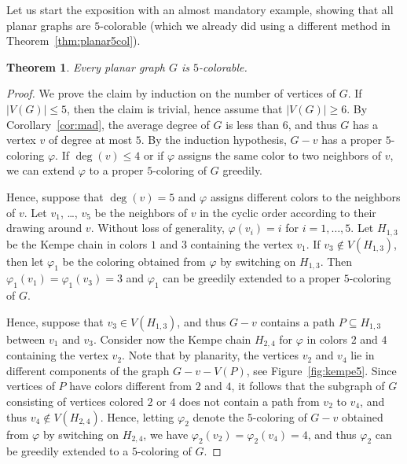 \documentclass[12pt,twoside,openright,a4paper]{book}
\newtheorem{theorem}{Theorem}[chapter]
\begin{document}
Let us start the exposition with an almost mandatory example, showing that all planar graphs are $5$-colorable
(which we already did using a different method in Theorem~\ref{thm:planar5col}).

\begin{theorem}\label{thm:planar5col-kempe}
Every planar graph $G$ is $5$-colorable.
\end{theorem}
\begin{proof}
We prove the claim by induction on the number of vertices of $G$.  If $|V(G)|\le 5$, then the claim is trivial,
hence assume that $|V(G)|\ge 6$.  By Corollary~\ref{cor:mad}, the average degree of $G$ is less than $6$, and
thus $G$ has a vertex $v$ of degree at most $5$.  By the induction hypothesis, $G-v$ has a proper $5$-coloring $\varphi$.
If $\deg(v)\le 4$ or if $\varphi$ assigns the same color to two neighbors of $v$, we can extend $\varphi$ to a proper $5$-coloring
of $G$ greedily.

Hence, suppose that $\deg(v)=5$ and $\varphi$ assigns different colors to the neighbors of $v$.  Let $v_1$, \ldots, $v_5$
be the neighbors of $v$ in the cyclic order according to their drawing around $v$.  Without loss of generality, $\varphi(v_i)=i$
for $i=1,\ldots, 5$.  Let $H_{1,3}$ be the Kempe chain in colors $1$ and $3$ containing the vertex $v_1$.
If $v_3\not\in V(H_{1,3})$, then let $\varphi_1$ be the coloring obtained from $\varphi$ by switching on $H_{1,3}$.
Then $\varphi_1(v_1)=\varphi_1(v_3)=3$ and $\varphi_1$ can be greedily extended to a proper $5$-coloring
of $G$.

Hence, suppose that $v_3\in V(H_{1,3})$, and thus $G-v$ contains a path $P\subseteq H_{1,3}$ between $v_1$ and $v_3$.
Consider now the Kempe chain $H_{2,4}$ for $\varphi$ in colors $2$ and $4$ containing the vertex $v_2$.  Note that by planarity,
the vertices $v_2$ and $v_4$ lie in different components of the graph $G-v-V(P)$, see Figure~\ref{fig:kempe5}.
Since vertices of $P$ have colors different from $2$ and $4$, it follows that the subgraph of $G$ consisting of vertices colored $2$ or $4$
does not contain a path from $v_2$ to $v_4$, and thus $v_4\not\in V(H_{2,4})$.  Hence, letting $\varphi_2$ denote the
$5$-coloring of $G-v$ obtained from $\varphi$ by switching on $H_{2,4}$, we have $\varphi_2(v_2)=\varphi_2(v_4)=4$,
and thus $\varphi_2$ can be greedily extended to a $5$-coloring of $G$.
\end{proof}
\end{document}

